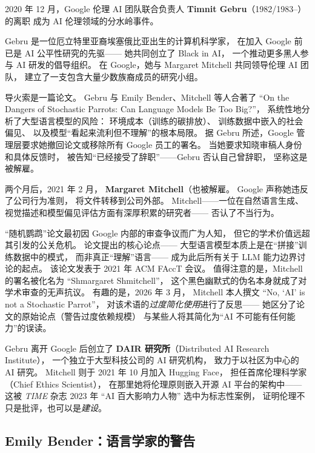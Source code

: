 2020 年 12 月，Google 伦理 AI 团队联合负责人
\textbf{Timnit Gebru}（1982/1983--）的离职
成为 AI 伦理领域的分水岭事件。

Gebru 是一位厄立特里亚裔埃塞俄比亚出生的计算机科学家，
在加入 Google 前已是 AI 公平性研究的先驱——
她共同创立了 Black in AI，
一个推动更多黑人参与 AI 研发的倡导组织。
在 Google，她与 Margaret Mitchell 共同领导伦理 AI 团队，
建立了一支包含大量少数族裔成员的研究小组。

导火索是一篇论文。
Gebru 与 Emily Bender、Mitchell 等人合著了
``On the Dangers of Stochastic Parrots:
Can Language Models Be Too Big?''，
系统性地分析了大型语言模型的风险：
环境成本（训练的碳排放）、
训练数据中嵌入的社会偏见、
以及模型``看起来流利但不理解''的根本局限。
据 Gebru 所述，Google 管理层要求她撤回论文或移除所有 Google 员工的署名。
当她要求知晓审稿人身份和具体反馈时，
被告知``已经接受了辞职''——Gebru 否认自己曾辞职，
坚称这是被解雇。

两个月后，2021 年 2 月，
\textbf{Margaret Mitchell}（也被解雇。
Google 声称她违反了公司行为准则，
将文件转移到公司外部。
Mitchell——一位在自然语言生成、
视觉描述和模型偏见评估方面有深厚积累的研究者——
否认了不当行为。

\begin{corebox}
``随机鹦鹉''论文最初因 Google 内部的审查争议而广为人知，
但它的学术价值远超其引发的公关危机。
论文提出的核心论点——
大型语言模型本质上是在``拼接''训练数据中的模式，
而非真正``理解''语言——
成为此后所有关于 LLM 能力边界讨论的起点。
该论文发表于 2021 年 ACM FAccT 会议。
值得注意的是，Mitchell 的署名被化名为
``Shmargaret Shmitchell''，
这个黑色幽默式的伪名本身就成了对学术审查的无声抗议。
有趣的是，2026 年 3 月，
Mitchell 本人撰文 ``No, `AI' is not a Stochastic Parrot''，
对该术语的\emph{过度简化使用}进行了反思——
她区分了论文的原始论点（警告过度依赖规模）
与某些人将其简化为``AI 不可能有任何能力''的误读。
\end{corebox}

Gebru 离开 Google 后创立了
\textbf{DAIR 研究所}（Distributed AI Research Institute），
一个独立于大型科技公司的 AI 研究机构，
致力于以社区为中心的 AI 研究。
Mitchell 则于 2021 年 10 月加入 Hugging Face，
担任首席伦理科学家（Chief Ethics Scientist），
在那里她将伦理原则嵌入开源 AI 平台的架构中——
这被 \emph{TIME} 杂志 2023 年 ``AI 百大影响力人物''
选中为标志性案例，
证明伦理不只是批评，也可以是\emph{建设}。

\subsection{Emily Bender：语言学家的警告}

